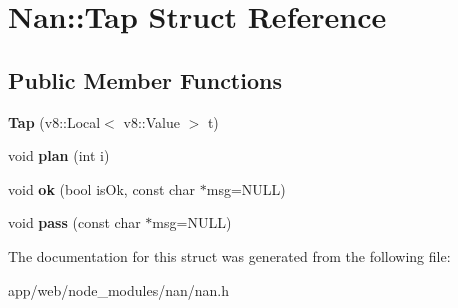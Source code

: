 \hypertarget{struct_nan_1_1_tap}{}\section{Nan\+:\+:Tap Struct Reference}
\label{struct_nan_1_1_tap}
\subsection*{Public Member Functions}
\begin{DoxyCompactItemize}
\item 
\mbox{\label{struct_nan_1_1_tap_a4498ab6e637154b5e045f4b957c4bdd2}} 
{\bfseries Tap} (v8\+::\+Local$<$ v8\+::\+Value $>$ t)
\item 
\mbox{\label{struct_nan_1_1_tap_ad73ffa08530111c0da42292966a7efa8}} 
void {\bfseries plan} (int i)
\item 
\mbox{\label{struct_nan_1_1_tap_ab14e52203c7c8e77ff31ca8118f0f42e}} 
void {\bfseries ok} (bool is\+Ok, const char $\ast$msg=N\+U\+LL)
\item 
\mbox{\label{struct_nan_1_1_tap_a806f047f699f9d068ceebb145115b077}} 
void {\bfseries pass} (const char $\ast$msg=N\+U\+LL)
\end{DoxyCompactItemize}


The documentation for this struct was generated from the following file\+:\begin{DoxyCompactItemize}
\item 
app/web/node\+\_\+modules/nan/nan.\+h\end{DoxyCompactItemize}

